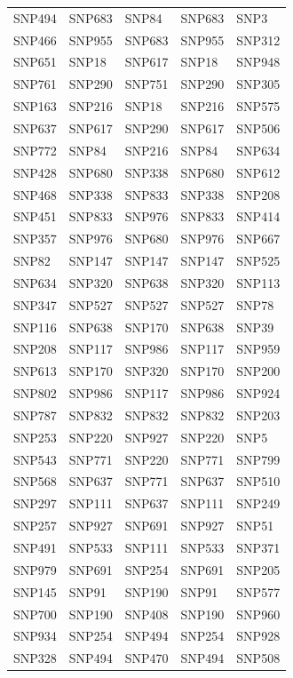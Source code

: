 \begin{table}[ht]
\begin{tabular}{lllll}
  SNP494 & SNP683 & SNP84 & SNP683 & SNP3 \\ 
  SNP466 & SNP955 & SNP683 & SNP955 & SNP312 \\ 
  SNP651 & SNP18 & SNP617 & SNP18 & SNP948 \\ 
  SNP761 & SNP290 & SNP751 & SNP290 & SNP305 \\ 
  SNP163 & SNP216 & SNP18 & SNP216 & SNP575 \\ 
  SNP637 & SNP617 & SNP290 & SNP617 & SNP506 \\ 
  SNP772 & SNP84 & SNP216 & SNP84 & SNP634 \\ 
  SNP428 & SNP680 & SNP338 & SNP680 & SNP612 \\ 
  SNP468 & SNP338 & SNP833 & SNP338 & SNP208 \\ 
  SNP451 & SNP833 & SNP976 & SNP833 & SNP414 \\ 
  SNP357 & SNP976 & SNP680 & SNP976 & SNP667 \\ 
  SNP82 & SNP147 & SNP147 & SNP147 & SNP525 \\ 
  SNP634 & SNP320 & SNP638 & SNP320 & SNP113 \\ 
  SNP347 & SNP527 & SNP527 & SNP527 & SNP78 \\ 
  SNP116 & SNP638 & SNP170 & SNP638 & SNP39 \\ 
  SNP208 & SNP117 & SNP986 & SNP117 & SNP959 \\ 
  SNP613 & SNP170 & SNP320 & SNP170 & SNP200 \\ 
  SNP802 & SNP986 & SNP117 & SNP986 & SNP924 \\ 
  SNP787 & SNP832 & SNP832 & SNP832 & SNP203 \\ 
  SNP253 & SNP220 & SNP927 & SNP220 & SNP5 \\ 
  SNP543 & SNP771 & SNP220 & SNP771 & SNP799 \\ 
  SNP568 & SNP637 & SNP771 & SNP637 & SNP510 \\ 
  SNP297 & SNP111 & SNP637 & SNP111 & SNP249 \\ 
  SNP257 & SNP927 & SNP691 & SNP927 & SNP51 \\ 
  SNP491 & SNP533 & SNP111 & SNP533 & SNP371 \\ 
  SNP979 & SNP691 & SNP254 & SNP691 & SNP205 \\ 
  SNP145 & SNP91 & SNP190 & SNP91 & SNP577 \\ 
  SNP700 & SNP190 & SNP408 & SNP190 & SNP960 \\ 
  SNP934 & SNP254 & SNP494 & SNP254 & SNP928 \\ 
  SNP328 & SNP494 & SNP470 & SNP494 & SNP508 \\ 

\end{tabular}
\end{table}
